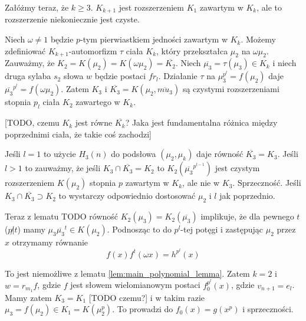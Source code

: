 Załóżmy teraz, że $k \geq 3$. $K_{k+1}$ jest rozszerzeniem $K_1$ zawartym w
$K_k$, ale to rozszerzenie niekoniecznie jest czyste.

Niech $\omega \neq 1$ będzie $p$-tym pierwiastkiem jedności zawartym w $K_k$.
Możemy zdefiniować $K_{k+1}$-automorfizm $\tau$ ciała $K_k$, który przekształca
$\mu_2$ na $\omega \mu_2$. 
Zauważmy, że $K_2 = K\left(\mu_2\right) = K\left(\omega \mu_2\right) =
\overline{K_2}$.
Niech $\overline{\mu_3} = \tau(\mu_3) \in K_k$ i niech druga sylaba $s_2$ słowa
$w$ będzie postaci $fr_l$.
Działanie $\tau$ na $\mu_3^{p^l} = f\left(\mu_2\right)$ daje
$\overline{\mu_3}^{p^l} = f\left(\omega\mu_2\right)$. Zatem $K_3$ i
$\overline{K_3} = K\left(\mu_2, \overline{mu_3}\right)$ są czystymi
rozszerzeniami stopnia $p_l$ ciała $K_2$ zawartego w $K_k$.

[TODO, czemu $K_k$ jest równe $\overline{K_k}$? Jaka jest fundamentalna różnica
między poprzednimi ciała, że takie coś zachodzi]

Jeśli $l = 1$ to użycie $H_3(n)$ do podsłowa $\left(\mu_2, \mu_k\right)$ daje
równość $\overline{K_3} = K_3$. Jeśli $l > 1$ to zauważmy, że jeśli $K_3 \cap
\overline{K_3} = K_2$ to $K_2\left(\overline{\mu_3}^{p^{l-1}}\right)$ jest
czystym rozszerzeniem $K\left(\mu_2\right)$ stopnia $p$ zawartym w $K_k$, ale
nie w $K_3$. Sprzeczność. Jeśli $K_3 \cap \overline{K_3} \supset K_2$ to
wystarczy odpowiednio dostosować $\mu_2$ i $l$ jak poprzednio.

Teraz z lematu TODO równość $K_2\left(\mu_3\right) =
K_2\left(\overline{\mu_3}\right)$ implikuje, że dla pewnego $t$ ($p \not | t$)
mamy $\mu_3\overline{\mu_3}^t \in K\left(\mu_2\right)$. Podnosząc to do
$p^l$-tej potęgi i zastępując $\mu_2$ przez $x$ otrzymamy równanie
\[ f(x)f^t(\omega x) = h^{p^l}(x)\]

To jest niemożliwe z lematu \ref{lem:main_polynomial_lemma}. Zatem $k = 2$ i $w
= r_{m_1}f$, gdzie $f$ jest słowem wielomianowym postaci $f_0^{p^l}(x)$, gdzie
$v_{n+1} = e_l$. Mamy zatem $K_3 = K_1$ [TODO czemu?] i  w takim razie $\mu_3 =
f\left(\mu_2\right) \in K_1 = K\left(\mu_2^p\right)$. To prowadzi do $f_0(x) =
g\left(x^p\right)$ i sprzeczności.

